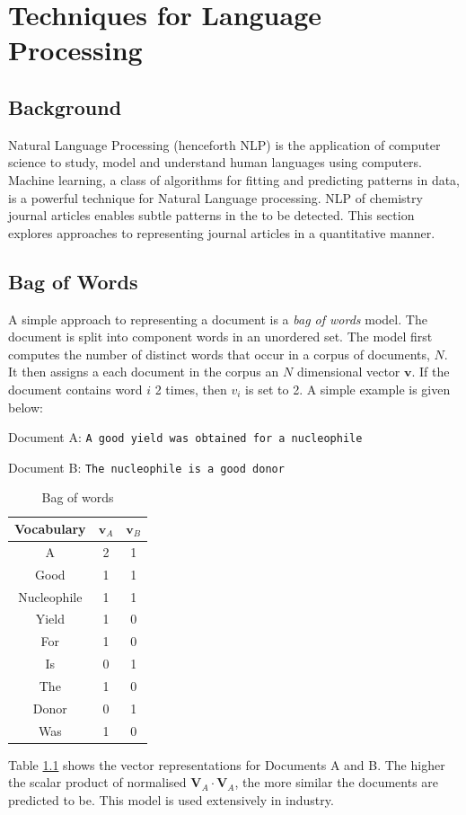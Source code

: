 \chapter{Techniques for Language Processing}
\label{chapt:NLP}
\section{Background}
Natural Language Processing (henceforth NLP) is the application of computer science to study, model and understand human languages using computers. Machine learning, a class of algorithms for fitting and predicting patterns in data, is a powerful technique for Natural Language processing. NLP of chemistry journal articles enables subtle patterns in the to be detected. This section explores approaches to representing journal articles in a quantitative manner.
\section{Bag of Words}
A simple approach to representing a document is a \emph{bag of words} model. The document is split into component words in an unordered set. The model first computes the number of distinct words that occur in a corpus of documents, $N$. It then assigns a each document in the corpus an $N$ dimensional vector $\mathbf{v}$. If the document contains word $i$ 2 times, then $v_{i}$ is set to 2. A simple example is given below:

Document A: \texttt{A good yield was obtained for a nucleophile}

Document B: \texttt{The nucleophile is a good donor}
\begin{table}[H]
\label{tab:BAGOFWORDS}
\caption{Bag of words}
\begin{center}
\begin{tabular}{||c|c|c||}
\hline
Vocabulary &  $\mathbf{v}_A$ & $\mathbf{v}_B$\\
\hline
A & 2 & 1\\
Good & 1 & 1\\
Nucleophile & 1 & 1 \\
Yield & 1 & 0\\
For & 1& 0\\
Is & 0 & 1\\
The & 1 & 0\\
Donor & 0 & 1\\
Was & 1 & 0\\
\hline
\end{tabular}
\end{center}
\end{table}
Table \ref{tab:BAGOFWORDS} shows the vector representations for Documents A and B. The higher the scalar product of normalised $\mathbf{V}_A \cdot \mathbf{V}_A$, the more similar the documents are predicted to be. This model is used extensively in industry.
